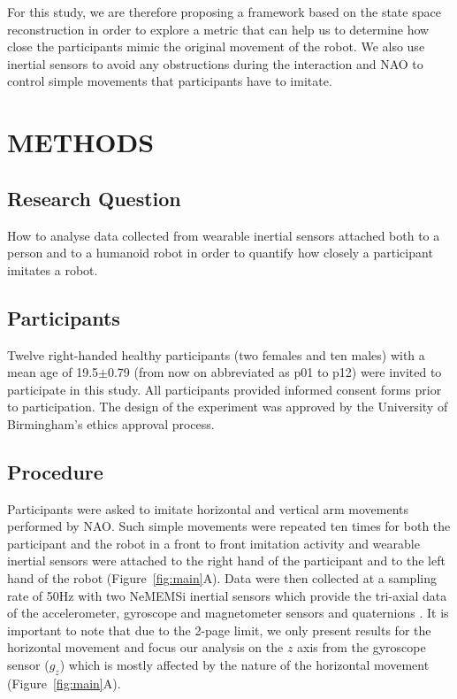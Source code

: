 \documentclass{sig-alternate-05-2015}
\begin{document}
For this study, we are therefore proposing a framework based on the state space reconstruction 
in order to explore a metric that can help us to determine 
how close the participants mimic the original movement of the robot.
We also use inertial sensors to avoid any obstructions during the interaction 
and NAO to control simple movements that participants have to imitate.

\section{METHODS}

\subsection{Research Question}

How to analyse  data collected from wearable inertial sensors attached both 
to a person and to a humanoid robot in order to quantify how closely a participant 
imitates a robot.


\subsection{Participants}
Twelve right-handed healthy participants (two females and ten males)
with a mean age of 19.5$\pm$0.79 (from now on abbreviated as p01 to p12) were invited to 
participate in this study. 
All participants provided informed consent forms prior to participation.
The design of the experiment was approved by the University of Birmingham's ethics approval
process. 

 
\subsection{Procedure}
Participants were asked to imitate horizontal and vertical arm movements
performed by NAO.
Such simple movements were repeated ten times for both the participant and the robot
 in a front to front imitation activity
and
 wearable inertial sensors were attached to the right hand of the participant and to the left hand of the robot
(Figure~\ref{fig:main}A).
Data were then collected at a sampling rate of 50Hz with two NeMEMSi inertial sensors
which provide the tri-axial data of the accelerometer, gyroscope and magnetometer sensors and
quaternions \cite{Comotti2014}. 
It is important to note that due to the 2-page limit, we only present
results for the horizontal movement and focus our analysis on the $z$ axis from the gyroscope sensor ($g_z$) 
which is mostly affected by the nature of the horizontal movement (Figure~\ref{fig:main}A).
\end{document}

